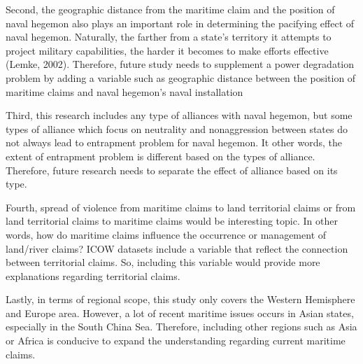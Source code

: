 \documentclass{article}
\begin{document}
 Second, the geographic distance from the maritime claim and the position of naval hegemon also plays an important role in determining the pacifying effect of naval hegemon. Naturally, the farther from a state’s territory it attempts to project military capabilities, the harder it becomes to make efforts effective (Lemke, 2002). Therefore, future study needs to supplement a power degradation problem by adding a variable such as geographic distance between the position of maritime claims and naval hegemon’s naval installation

Third, this research includes any type of alliances with naval hegemon, but some types of alliance which focus on neutrality and nonaggression between states do not always lead to entrapment problem for naval hegemon. It other words, the extent of entrapment problem is different based on the types of alliance. Therefore, future research needs to separate the effect of alliance based on its type. 

Fourth, spread of violence from maritime claims to land territorial claims or from land
territorial claims to maritime claims would be interesting topic. In other words, how do maritime claims influence the occurrence or management of land/river claims? ICOW datasets include a variable that reflect the connection between territorial claims. So, including this variable would provide more explanations regarding territorial claims.

Lastly, in terms of regional scope, this study only covers the Western Hemisphere and Europe area. However, a lot of recent maritime issues occurs in Asian states, especially in the South China Sea. Therefore, including other regions such as Asia or Africa is conducive to expand the understanding regarding current maritime claims.
\end{document}
